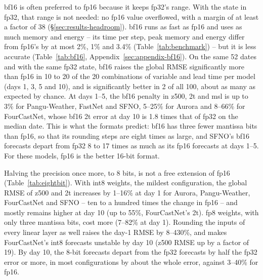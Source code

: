 bf16 is often preferred to fp16 because it keeps fp32's range.
With the state in fp32, that range is not needed: no fp16 value
overflowed, with a margin of at least a factor of 38
(\S\ref{sec:results-headroom}). bf16 runs as fast as fp16 and uses as
much memory and energy -- its time per step, peak memory and energy
differ from fp16's by at most 2\%, 1\% and 3.4\%
(Table~\ref{tab:benchmark}) -- but it is less
accurate (Table~\ref{tab:bf16}, Appendix~\ref{sec:appendix-bf16}). On
the same 52 dates and with the same fp32 state, bf16 raises the global
RMSE significantly more than fp16 in 10 to 20 of the 20 combinations of
variable and lead time per model (days 1, 3, 5 and 10), and is significantly
better in 2 of all 100, about as many as expected by chance. At days 1--5, the bf16
penalty in z500, 2t and msl is up to 3\% for Pangu-Weather, FastNet and SFNO, 5--25\% for
Aurora and 8--66\% for FourCastNet, whose bf16 2t error at day 10 is 1.8
times that of fp32 on the median date. This is what the formats predict:
bf16 has three fewer mantissa bits than fp16, so that its rounding steps
are eight times as large, and SFNO's bf16 forecasts depart from fp32 8 to
17 times as much as its fp16 forecasts at days 1--5. For these models,
fp16 is the better 16-bit format.

\label{sec:results-8bit}



Halving the precision once more, to 8 bits, is not a free
extension of fp16 (Table~\ref{tab:eightbit}). With int8 weights, the
mildest configuration, the global RMSE of z500 and 2t increases by
1--16\% at day 1 for Aurora, Pangu-Weather, FourCastNet and SFNO -- ten
to a hundred times the change in fp16 -- and mostly remains higher at
day 10 (up to 55\%, FourCastNet's 2t). fp8 weights, with only three
mantissa bits, cost more (7--82\% at day 1). Rounding the inputs of every
linear layer as well raises the day-1 RMSE by 8--430\%, and makes
FourCastNet's int8 forecasts unstable by day 10 (z500 RMSE up by a factor
of 19). By day 10, the 8-bit forecasts depart from the fp32 forecasts by
half the fp32 error or more, in most configurations by about the whole
error, against 3--40\% for fp16.

